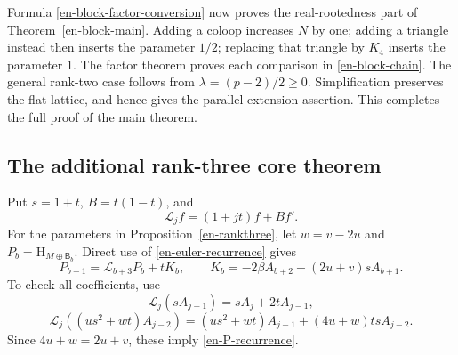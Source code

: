 \documentclass[12pt]{amsart}
\theoremstyle{definition}
\theoremstyle{remark}
\numberwithin{equation}{section}
\newcommand{\HCh}{\mathrm{H}}
\newcommand{\Bmat}{\mathsf{B}}
\newcommand{\Dop}[1]{\mathscr{L}_{#1}}
\begin{document}
Formula \eqref{en-block-factor-conversion} now proves the real-rootedness part of Theorem~\ref{en-block-main}. Adding a coloop increases $N$ by one; adding a triangle instead then inserts the parameter $1/2$; replacing that triangle by $K_4$ inserts the parameter $1$. The factor theorem proves each comparison in \eqref{en-block-chain}. The general rank-two case follows from $\lambda=(p-2)/2\geq0$. Simplification preserves the flat lattice, and hence gives the parallel-extension assertion. This completes the full proof of the main theorem.

\subsection{The additional rank-three core theorem}

Put $s=1+t$, $B=t(1-t)$, and
\[
 \Dop{j}f=(1+jt)f+Bf'.
\]
For the parameters in Proposition~\ref{en-rankthree}, let $w=v-2u$ and $P_b=\HCh_{M\oplus\Bmat_b}$. Direct use of \eqref{en-euler-recurrence} gives
\begin{equation}\label{en-P-recurrence}
 P_{b+1}=\Dop{b+3}P_b+tK_b,\qquad
 K_b=-2\beta A_{b+2}-(2u+v)sA_{b+1}.
\end{equation}
To check all coefficients, use
\[
 \Dop{j}(sA_{j-1})=sA_j+2tA_{j-1},
\]
\[
 \Dop{j}((us^2+wt)A_{j-2})
 =(us^2+wt)A_{j-1}+(4u+w)tsA_{j-2}.
\]
Since $4u+w=2u+v$, these imply \eqref{en-P-recurrence}.
\end{document}
